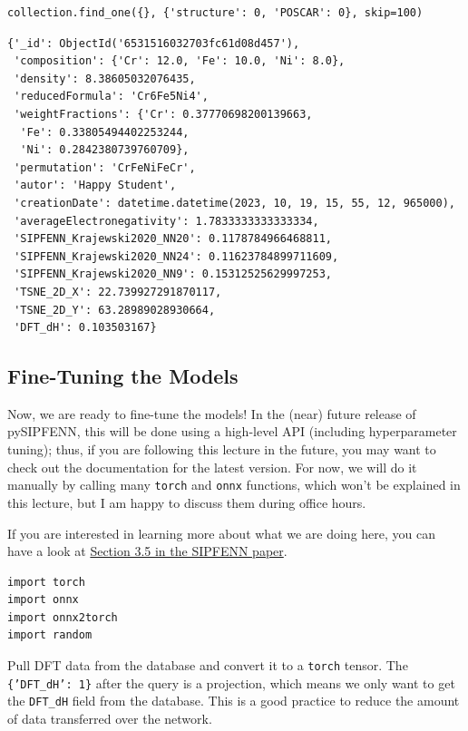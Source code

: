 \begin{verbatim}
collection.find_one({}, {'structure': 0, 'POSCAR': 0}, skip=100)
\end{verbatim}

\begin{verbatim}
{'_id': ObjectId('6531516032703fc61d08d457'),
 'composition': {'Cr': 12.0, 'Fe': 10.0, 'Ni': 8.0},
 'density': 8.38605032076435,
 'reducedFormula': 'Cr6Fe5Ni4',
 'weightFractions': {'Cr': 0.37770698200139663,
  'Fe': 0.33805494402253244,
  'Ni': 0.2842380739760709},
 'permutation': 'CrFeNiFeCr',
 'autor': 'Happy Student',
 'creationDate': datetime.datetime(2023, 10, 19, 15, 55, 12, 965000),
 'averageElectronegativity': 1.7833333333333334,
 'SIPFENN_Krajewski2020_NN20': 0.1178784966468811,
 'SIPFENN_Krajewski2020_NN24': 0.11623784899711609,
 'SIPFENN_Krajewski2020_NN9': 0.15312525629997253,
 'TSNE_2D_X': 22.739927291870117,
 'TSNE_2D_Y': 63.28989028930664,
 'DFT_dH': 0.103503167}
\end{verbatim}

\hypertarget{fine-tuning-the-models}{%
\subsection{Fine-Tuning the Models}\label{pysipfenntutorial2:fine-tuning-the-models}}

Now, we are ready to fine-tune the models! In the (near) future release
of pySIPFENN, this will be done using a high-level API (including
hyperparameter tuning); thus, if you are following this lecture in the
future, you may want to check out the documentation for the latest
version. For now, we will do it manually by calling many
\texttt{torch} and \texttt{onnx}
functions, which won't be explained in this lecture, but I am happy to
discuss them during office hours.

If you are interested in learning more about what we are doing here, you
can have a look at
\href{https://www.sciencedirect.com/science/article/pii/S0927025622000593?via\%3Dihub\#sec3}{Section
3.5 in the SIPFENN paper}.

\begin{verbatim}
import torch
import onnx
import onnx2torch
import random
\end{verbatim}

Pull DFT data from the database and convert it to a
\texttt{torch} tensor. The
\texttt{\{'DFT\_dH': 1\}} after the query is a
projection, which means we only want to get the
\texttt{DFT\_dH} field from the database. This is a
good practice to reduce the amount of data transferred over the network.

